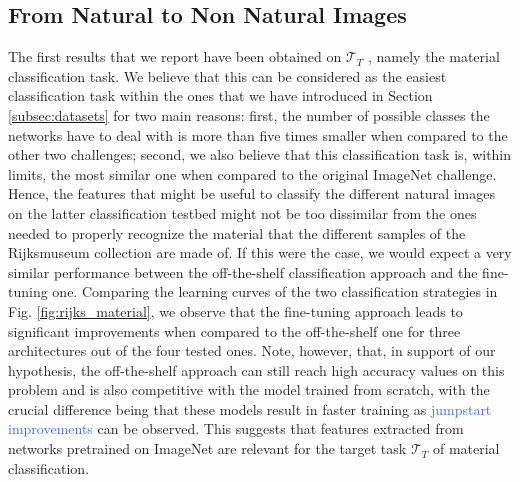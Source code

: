 \subsection{From Natural to Non Natural Images}
\label{subsec: natural_to_art}

The first results that we report have been obtained on $\mathcal{T}_T$ , namely the material classification task. We believe that this can be considered as the easiest classification task within the ones that we have introduced in Section \ref{subsec:datasets} for two main reasons: first, the number of possible classes the networks have to deal with is more than five times smaller when compared to the other two challenges; second, we also believe that this classification task is, within limits, the most similar one when compared to the original ImageNet challenge. Hence, the features that might be useful to classify the different natural images on the latter classification testbed might not be too dissimilar from the ones needed to properly recognize the material that the different samples of the Rijksmuseum collection are made of. If this were the case, we would expect a very similar performance between the off-the-shelf classification approach and the fine-tuning one. Comparing the learning curves of the two classification strategies in Fig. \ref{fig:rijks_material}, we observe that the fine-tuning approach leads to significant improvements when compared to the off-the-shelf one for three architectures out of the four tested ones. Note, however, that, in support of our hypothesis, the off-the-shelf approach can still reach high accuracy values on this problem and is also competitive with the model trained from scratch, with the crucial difference being that these models result in faster training as \textcolor{RoyalBlue}{jumpstart improvements} can be observed. This suggests that features extracted from networks pretrained on ImageNet are relevant for the target task $\mathcal{T}_T$ of material classification.




